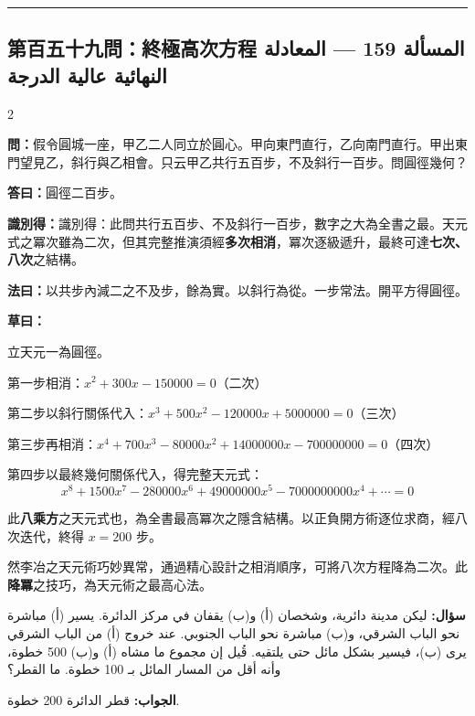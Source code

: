 \documentclass[11pt,a4paper]{article}
\newcommand{\ar}[1]{\arabicfont\beginR #1\endR}
\newcommand{\arb}[1]{\textbf{\arabicfont\beginR #1\endR}}
\newcommand{\longline}{\noindent\rule{\textwidth}{0.4pt}}
\newcommand{\arnote}[1]{\textcolor{arabicblue}{\ar{#1}}}
\newcommand{\wen}[1]{\par\noindent\textbf{\textcolor{probcolor}{問：}}{#1}\par}
\newcommand{\da}[1]{\par\noindent\textbf{\textcolor{anscolor}{答曰：}}{#1}\par}
\newcommand{\fayue}[1]{\par\noindent\textbf{\textcolor{methodcolor}{法曰：}}{#1}\par}
\newcommand{\caoyue}[1]{\par\noindent\textbf{草曰：}{#1}\par}
\newcommand{\zhi}[1]{\par\noindent\textbf{識別得：}{#1}\par}
\newcommand{\arwen}[1]{\par\noindent\arb{سؤال: }\arnote{#1}\par}
\newcommand{\arjwb}[1]{\par\noindent\arb{الجواب: }\arnote{#1}\par}
\begin{document}
\vspace{0.3cm}
\longline

\subsection*{第百五十九問：終極高次方程 \hfill \ar{المسألة 159 — المعادلة النهائية عالية الدرجة}}

\begin{paracol}{2}

\begin{leftcolumn}
\wen{假令圓城一座，甲乙二人同立於圓心。甲向東門直行，乙向南門直行。甲出東門望見乙，斜行與乙相會。只云甲乙共行五百步，不及斜行一百步。問圓徑幾何？}

\da{圓徑二百步。}

\zhi{識別得：此問共行五百步、不及斜行一百步，數字之大為全書之最。天元式之冪次雖為二次，但其完整推演須經\textbf{多次相消}，冪次逐級遞升，最終可達\textbf{七次、八次}之結構。}

\fayue{以共步內減二之不及步，餘為實。以斜行為從。一步常法。開平方得圓徑。}

\caoyue{
立天元一為圓徑。

第一步相消：$x^2 + 300x - 150000 = 0$（二次）

第二步以斜行關係代入：$x^3 + 500x^2 - 120000x + 5000000 = 0$（三次）

第三步再相消：$x^4 + 700x^3 - 80000x^2 + 14000000x - 700000000 = 0$（四次）

第四步以最終幾何關係代入，得完整天元式：
$$x^8 + 1500x^7 - 280000x^6 + 49000000x^5 - 7000000000x^4 + \cdots = 0$$

此\textbf{八乘方}之天元式也，為全書最高冪次之隱含結構。以正負開方術逐位求商，經八次迭代，終得 $x = 200$ 步。

然李冶之天元術巧妙異常，通過精心設計之相消順序，可將八次方程降為二次。此\textbf{降冪}之技巧，為天元術之最高心法。}
\end{leftcolumn}

\begin{rightcolumn}
\arwen{ليكن مدينة دائرية، وشخصان (أ) و(ب) يقفان في مركز الدائرة. يسير (أ) مباشرة نحو الباب الشرقي، و(ب) مباشرة نحو الباب الجنوبي. عند خروج (أ) من الباب الشرقي يرى (ب)، فيسير بشكل مائل حتى يلتقيه. قُيل إن مجموع ما مشاه (أ) و(ب) 500 خطوة، وأنه أقل من المسار المائل بـ 100 خطوة. ما القطر؟}

\arjwb{قطر الدائرة 200 خطوة.}


\end{rightcolumn}
\end{paracol}
\end{document}
